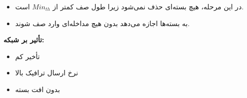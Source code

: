 \begin{enumerate}
\begin{qsolve}
\begin{enumerate}
			
			\begin{itemize}
				\item در این مرحله، هیچ بسته‌ای حذف نمی‌شود زیرا طول صف کمتر از \( Min_{th} \) است.
				\item {} به بسته‌ها اجازه می‌دهد بدون هیچ مداخله‌ای وارد صف شوند.
			\end{itemize}
			\textbf{تأثیر بر شبکه:}
			\begin{itemize}
				\item تأخیر کم
				\item نرخ ارسال ترافیک بالا
				\item بدون افت بسته
			\end{itemize}
		\end{enumerate}
	\end{qsolve}
\end{enumerate}

